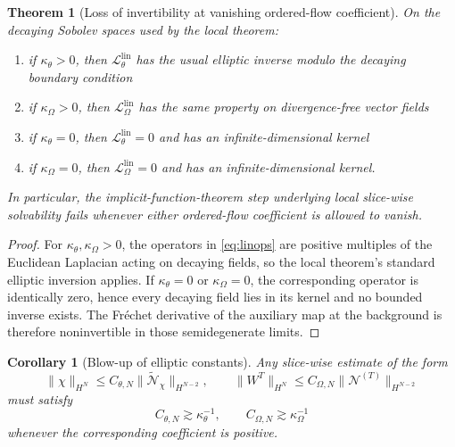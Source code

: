 \documentclass[11pt]{article}
\newtheorem{corollary}{Corollary}
\newtheorem{theorem}{Theorem}
\begin{document}
\begin{theorem}[Loss of invertibility at vanishing ordered-flow coefficient]
On the decaying Sobolev spaces used by the local theorem:
\begin{enumerate}
    \item if \(\kappa_\theta>0\), then \(\mathcal L_\theta^{\mathrm{lin}}\) has the usual elliptic inverse modulo the decaying boundary condition
    \item if \(\kappa_\Omega>0\), then \(\mathcal L_\Omega^{\mathrm{lin}}\) has the same property on divergence-free vector fields
    \item if \(\kappa_\theta=0\), then \(\mathcal L_\theta^{\mathrm{lin}}=0\) and has an infinite-dimensional kernel
    \item if \(\kappa_\Omega=0\), then \(\mathcal L_\Omega^{\mathrm{lin}}=0\) and has an infinite-dimensional kernel.
\end{enumerate}
In particular, the implicit-function-theorem step underlying local slice-wise solvability fails whenever either ordered-flow coefficient is allowed to vanish.
\end{theorem}

\begin{proof}
For \(\kappa_\theta,\kappa_\Omega>0\), the operators in \eqref{eq:linops} are positive multiples of the Euclidean Laplacian acting on decaying fields, so the local theorem's standard elliptic inversion applies. If \(\kappa_\theta=0\) or \(\kappa_\Omega=0\), the corresponding operator is identically zero, hence every decaying field lies in its kernel and no bounded inverse exists. The Fr\'echet derivative of the auxiliary map at the background is therefore noninvertible in those semidegenerate limits.
\end{proof}

\begin{corollary}[Blow-up of elliptic constants]
Any slice-wise estimate of the form
\begin{equation}
\|\chi\|_{H^N}\le C_{\theta,N}\|\widetilde{\mathcal N}_\chi\|_{H^{N-2}},
\qquad
\|W^T\|_{H^N}\le C_{\Omega,N}\|\mathcal N^{(T)}\|_{H^{N-2}}
\label{eq:blowup}
\end{equation}
must satisfy
\begin{equation}
C_{\theta,N}\gtrsim \kappa_\theta^{-1},
\qquad
C_{\Omega,N}\gtrsim \kappa_\Omega^{-1}
\label{eq:blowuprate}
\end{equation}
whenever the corresponding coefficient is positive.
\end{corollary}
\end{document}
